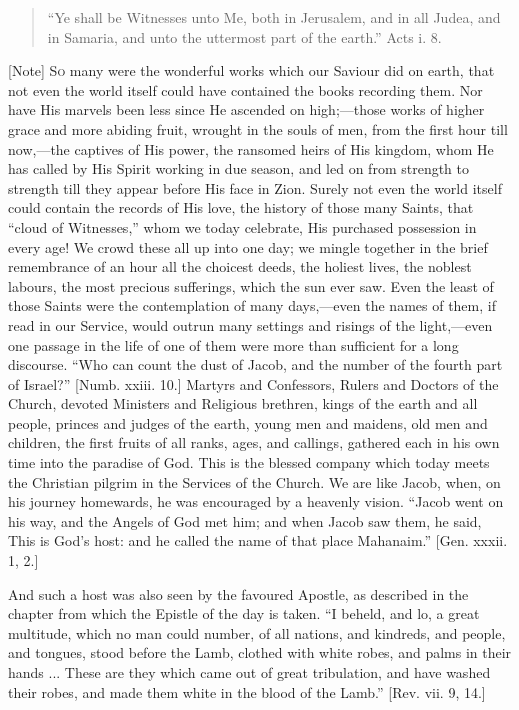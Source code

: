 \begin{quote}

``Ye shall be Witnesses unto Me, both in Jerusalem, and in all
Judea, and in Samaria, and unto the uttermost part of the earth.''
Acts i. 8.

\end{quote}

[Note] S\textsc{o} many were the wonderful
works which our Saviour did on earth, that not even the world itself
could have contained the books recording them. Nor have His marvels been
less since He ascended on high;—those works of higher grace and more
abiding fruit, wrought in the souls of men, from the first hour till
now,—the captives of His power, the ransomed heirs of His kingdom,
whom He has called by His Spirit working in due season, and led on from
strength to strength till they appear before His face in Zion. Surely
not even the world itself could contain the records of His love, the
history of those many Saints, that ``cloud of Witnesses,'' whom
we today celebrate, His purchased possession in every age! We crowd
these all up into one day; we mingle together in the brief remembrance
of an hour all the choicest deeds, the holiest lives, the noblest
labours, the most precious sufferings, which the sun ever saw. Even the
least of those Saints were the contemplation of many days,—even the
names of them, if read in our Service, would outrun many settings and
risings of the light,—even one passage in the life of one of them were
more than sufficient for a long discourse. ``Who can count the dust
of Jacob, and the number of the fourth part of Israel?'' [Numb.
xxiii. 10.] Martyrs and Confessors, Rulers and Doctors of the Church,
devoted Ministers and Religious brethren, kings of the earth and all
people, princes and judges of the earth, young men and maidens, old men
and children, the first fruits of all ranks, ages, and callings,
gathered each in his own time into the paradise of God. This is the
blessed company which today meets the Christian pilgrim in the Services
of the Church. We are like Jacob, when, on his journey homewards, he was
encouraged by a heavenly vision. ``Jacob went on his way, and the
Angels of God met him; and when Jacob saw them, he said, This is God's
host: and he called the name of that place Mahanaim.'' [Gen. xxxii.
1, 2.]

And such a host was also seen by the favoured Apostle, as described
in the chapter from which the Epistle of the day is taken. ``I
beheld, and lo, a great multitude, which no man could number, of all
nations, and kindreds, and people, and tongues, stood before the Lamb,
clothed with white robes, and palms in their hands ... These are they
which came out of great tribulation, and have washed their robes, and
made them white in the blood of the Lamb.'' [Rev. vii. 9, 14.]

